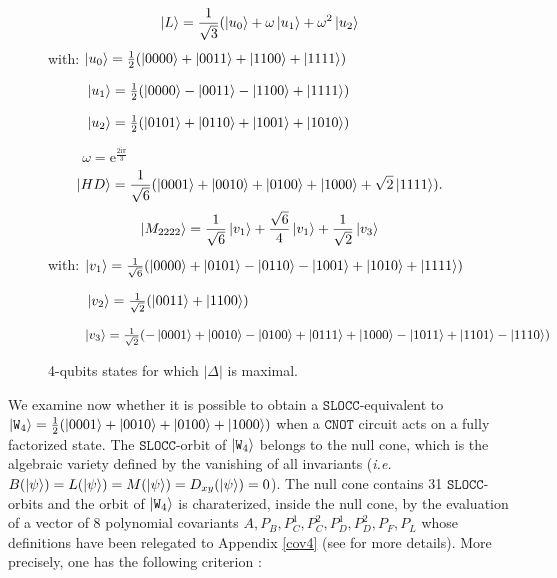 \documentclass[a4paper,12pt,fleqn]{article}
\newcommand\SLOCC{\mathtt{SLOCC}}
\newcommand\W{\mathtt{W}}
\newcommand\cnot{\mathtt{CNOT}}
\newcommand\ee{\mathrm e}
\newcommand\ii{\mathrm i}
\begin{document}
    \begin{figure}[h]
     \begin{equation}
        \ket{L}=\frac{1}{\sqrt3}(\ket{u_0}+\omega\ket{u_1}+\omega^2\ket{u_2}
      \end{equation}
      with: $\ket{u_0}=\frac{1}{2}(\ket{0000} + \ket{0011} + \ket{1100} + \ket{1111})$
      
      $\phantom{with: }\ket{u_1}=\frac{1}{2}(\ket{0000} - \ket{0011} - \ket{1100} + \ket{1111})$ 
      
      $\phantom{with: }\ket{u_2}=\frac{1}{2}(\ket{0101} + \ket{0110} + \ket{1001} + \ket{1010})$

      $\phantom{with: }\omega=\ee^{\frac{2\ii\pi}{3}}$
      \begin{equation}
        \ket{HD} =\frac{1}{\sqrt6}(\ket{0001} + \ket{0010} + \ket{0100} + \ket{1000} + \sqrt{2}\ket{1111}). 
      \end{equation}
      \begin{equation}
\ket{M_{2222}}=\frac{1}{\sqrt6}\ket{v_1}+\frac{\sqrt6}{4}\ket{v_1}+\frac{1}{\sqrt2}\ket{v_3}
      \end{equation}
      with: $\ket{v_1}=\frac{1}{\sqrt{6}}(\ket{0000} + \ket{0101} - \ket{0110} - \ket{1001} + \ket{1010} + \ket{1111})$
      
      $\phantom{with: }\ket{v_2}=\frac{1}{\sqrt{2}}(\ket{0011} + \ket{1100})$
      
      $\phantom{with: }\ket{v_3}=\frac{1}{\sqrt{2}}(-\ket{0001} + \ket{0010} - \ket{0100} + \ket{0111} + \ket{1000} - \ket{1011} + \ket{1101} - \ket{1110})$
      \caption{4-qubits states for which $|\Delta|$ is maximal. \label{delta_max}}
    \end{figure}
    \medskip

    We examine now whether it is possible to obtain a $\SLOCC$-equivalent to $\ket{\W_4}=\frac12(\ket{0001}+\ket{0010}+\ket{0100}+\ket{1000})$ when a $\cnot$ circuit acts on a fully factorized state. 
    The $\SLOCC$-orbit of $\ket{\W_4}$ belongs to the null cone, which is the algebraic variety defined by the vanishing of all invariants (\textit{i.e.} $B(\ket{\psi})=L(\ket{\psi})=M(\ket{\psi})=D_{xy}(\ket{\psi})=0$).
    The null cone contains 31 $\SLOCC$-orbits and the orbit of $\ket{\W_4}$ is charaterized, inside the null cone, by the evaluation of a vector of 8 polynomial covariants 
    $A, P_B ,P_C^1 ,P_C^2 ,P_D^1,P_D^2,P_F,P_L$ whose definitions have been relegated to Appendix \ref{cov4} (see \cite[Section~III]{2014HLT} for more details).
    More precisely, one has the following criterion :
\end{document}
